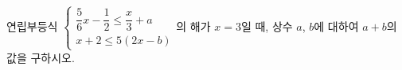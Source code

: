 연립부등식 $\begin{cases} \dfrac{5}{6}x-\dfrac{1}{2}\le \dfrac{x}{3}+a \\[4pt] x+2\le 5(2x-b) \end{cases}$의 해가 $x=3$일 때, 상수 $a$, $b$에 대하여 $a+b$의 값을 구하시오.
